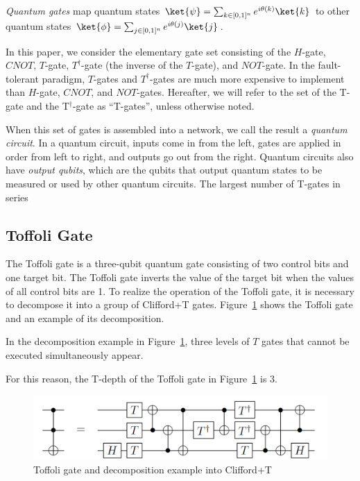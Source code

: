 \emph{Quantum gates} map quantum states $\ket{\psi} = \sum_{k \in [0,1]^n} e^{i {\theta}(k)} \ket{k}$ to
other quantum states $\ket{\phi} = \sum_{j \in [0,1]^n} e^{i {\theta}(j)} \ket{j}$.


In this paper, we consider the elementary gate set consisting of the $H$-gate, $\mathit{CNOT}$, $T$-gate, $T^{\dagger}$-gate  (the inverse of the $T$-gate), and $NOT$-gate. In the fault-tolerant paradigm, $T$-gates and $T^{\dagger}$-gates are much more expensive to implement than
$H$-gate, $CNOT$, and $NOT$-gates. Hereafter, we will refer to the set of the T-gate and the T$^{\dagger}$-gate as ``T-gates'', unless otherwise noted.

When this set of gates is assembled into a network, we call the result a \emph{quantum circuit}. In a quantum circuit, inputs come in from the left, gates are applied in order from left to right, and outputs go out from
the right. Quantum circuits also have \emph{output qubits}, which are the qubits that output quantum states to be measured or used by other quantum circuits. The largest number of T-gates in series

\subsection{Toffoli Gate}
The Toffoli gate is a three-qubit quantum gate consisting of two control bits and one target bit.
The Toffoli gate inverts the value of the target bit when the values of all control bits are 1.
To realize the operation of the Toffoli gate, it is necessary to decompose it into a group of Clifford+T gates.
Figure~\ref{toffoli} shows the Toffoli gate and an example of its decomposition\cite{amy2013meet}.
\par
In the decomposition example in Figure~\ref{toffoli}, three levels of $T$ gates that cannot be executed simultaneously appear.

For this reason, the T-depth of the Toffoli gate in Figure~\ref{toffoli} is 3.

\begin{figure}[tbp]

\centering

\includegraphics[width=0.95\linewidth]{img/toffoli.pdf}

\caption{Toffoli gate and decomposition example into Clifford+T\cite{amy2013meet}}

\label{toffoli}

\end{figure}

